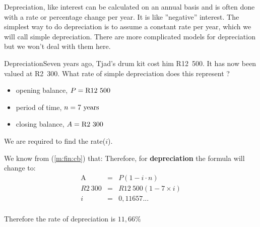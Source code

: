 \documentclass[10pt,a4paper,titlepage,twoside,openright]{report}
\begin{document}
Depreciation, like interest can be calculated on an annual basis and is often done with a rate or percentage change per year. It is like ''negative'' interest. The simplest way to do depreciation is to assume a constant rate per year, which we will call simple depreciation. There are more complicated models for depreciation but we won't deal with them here.

\begin{wex}{Depreciation}{Seven years ago, Tjad's drum kit cost him R12~500.  It has now been valued at R2~300.  What rate of simple depreciation does this represent ?}{
\begin{itemize}[topsep=0ex, partopsep=\parskip,itemsep=\parskip]
\item{opening balance, $P=\rm{R}12~500$}
\item{period of time, $n=7~\rm{years}$}
\item{closing balance, $A=\rm{R}2~300$}
\end{itemize}
\vspace{0.5cm}
We are required to find the rate($i$). 

We know from (\ref{m:fin:cb}) that:
Therefore, for \textbf{depreciation} the formula will change to:
\begin{eqnarray*}
\mbox{A} &=& P (1 - i\cdot n)\\
R2~300&=& R12~500 (1 - 7\times i)\\
i&=& 0,11657...\\
\end{eqnarray*}

Therefore the rate of depreciation is $11,66\%$
}
\end{wex}
\end{document}

